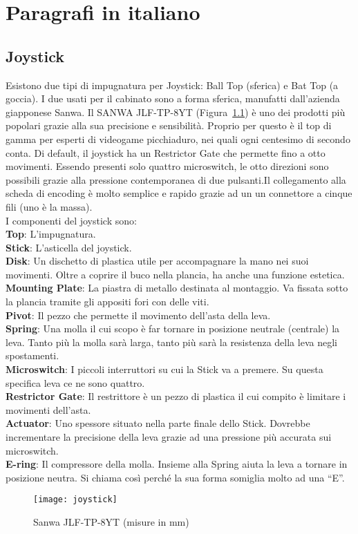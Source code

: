 \appendix
\renewcommand{\thechapter}{}
\chapter{Paragrafi in italiano}
\renewcommand{\thechapter}{\Alph{chapter}}
\section{Joystick}
 Esistono due tipi di impugnatura per Joystick: Ball Top (sferica) e Bat Top (a goccia). I due usati per il cabinato sono a forma sferica, manufatti dall’azienda giapponese Sanwa. Il SANWA JLF-TP-8YT (Figura~\ref{fig:sanwaita}) è uno dei prodotti più popolari grazie alla sua precisione e sensibilità. Proprio per questo è il top di gamma per esperti di videogame picchiaduro, nei quali ogni centesimo di secondo conta. Di default, il joystick ha un Restrictor Gate che permette fino a otto movimenti. Essendo presenti solo quattro microswitch, le otto direzioni sono possibili grazie alla pressione contemporanea di due pulsanti.Il collegamento alla scheda di encoding è molto semplice e rapido grazie ad un un connettore a cinque fili (uno è la massa).\\
I componenti del joystick sono:\\
\textbf{Top}: L’impugnatura.\\
\textbf{Stick}: L’asticella del joystick.\\
\textbf{Disk}: Un dischetto di plastica utile per accompagnare la mano nei suoi movimenti. Oltre a coprire il buco nella plancia, ha anche una funzione estetica.\\
\textbf{Mounting Plate}: La piastra di metallo destinata al montaggio. Va fissata sotto la plancia tramite gli appositi fori con delle viti.\\
\textbf{Pivot}: Il pezzo che permette il movimento dell'asta della leva.\\
\textbf{Spring}: Una molla il cui scopo è far tornare in posizione neutrale (centrale) la leva. Tanto più la molla sarà larga, tanto più sarà la resistenza della leva negli spostamenti.\\
\textbf{Microswitch}: I piccoli interruttori su cui la Stick va a premere. Su questa specifica leva ce ne sono quattro.\\
\textbf{Restrictor Gate}: Il restrittore è un pezzo di plastica il cui compito è limitare i movimenti dell'asta.\\
\textbf{Actuator}: Uno spessore situato nella parte finale dello Stick. Dovrebbe incrementare la precisione della leva grazie ad una pressione più accurata sui microswitch.\\
\textbf{E-ring}: Il compressore della molla. Insieme alla Spring aiuta la leva a tornare in posizione neutra. Si chiama così perché la sua forma somiglia molto ad una “E”.\\
\begin{figure}[h!]
\texttt{[image: joystick]}
\centering
\caption{Sanwa JLF-TP-8YT (misure in mm)}
\label{fig:sanwaita}
\end{figure}
